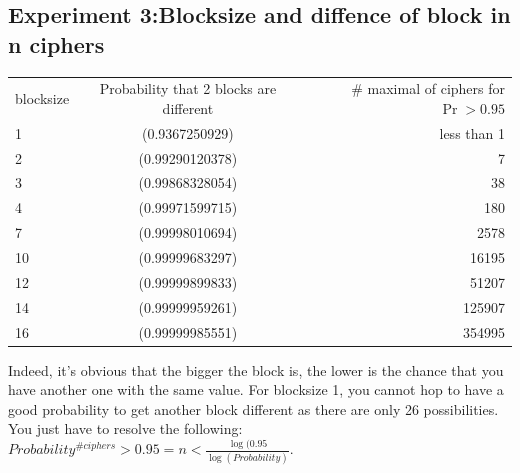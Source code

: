 \documentclass{article}
\begin{document}
\subsection{Experiment 3:Blocksize and diffence of block in n ciphers}

\begin{tabular}{|l|c|r|}
  \hline
  blocksize & Probability that 2 blocks are different & \# maximal of ciphers for $\Pr > 0.95$\\
	1 & (0.9367250929) & less than 1\\
	2 & (0.99290120378) & 7\\
	3 & (0.99868328054) & 38\\
	4 & (0.99971599715) & 180\\
	7 & (0.99998010694) & 2578\\
	10 & (0.99999683297) & 16195\\
	12 & (0.99999899833) & 51207\\
	14 & (0.99999959261) & 125907\\
	16 & (0.99999985551) & 354995\\
	\hline
\end{tabular}

Indeed, it's obvious that the bigger the block is, the lower is the chance that you have another one with the same value. For blocksize 1, you cannot hop to have a good probability to get another block different as there are only 26 possibilities. You just have to resolve the following:$Probability^{\#ciphers}>0.95 = n < \frac{\log(0.95}{\log(Probability)}$.
\appendix
\newpage
\end{document}
